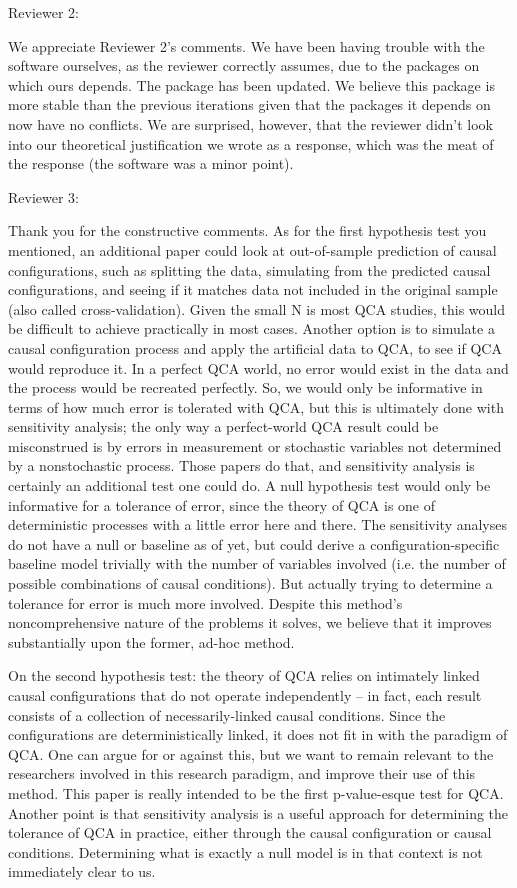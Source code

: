 \documentclass[12pt,stdletter,dateno,sigleft]{newlfm} %
\begin{document}
\begin{newlfm}
Reviewer 2: 

We appreciate Reviewer 2's comments. We have been having trouble with the software ourselves, as the reviewer correctly assumes, due to the packages on which ours depends. The package has been updated. We believe this package is more stable than the previous iterations given that the packages it depends on now have no conflicts. We are surprised, however, that the reviewer didn't look into our theoretical justification we wrote as a response, which was the meat of the response (the software was a minor point). \newline


Reviewer 3: 

Thank you for the constructive comments. As for the first hypothesis test you mentioned, an additional paper could look at out-of-sample prediction of causal configurations, such as splitting the data, simulating from the predicted causal configurations, and seeing if it matches data not included in the original sample (also called cross-validation). Given the small N is most QCA studies, this would be difficult to achieve practically in most cases. Another option is to simulate a causal configuration process and apply the artificial data to QCA, to see if QCA would reproduce it. In a perfect QCA world, no error would exist in the data and the process would be recreated perfectly. So, we would only be informative in terms of how much error is tolerated with QCA, but this is ultimately done with sensitivity analysis; the only way a perfect-world QCA result could be misconstrued is by errors in measurement or stochastic variables not determined by a nonstochastic process. Those papers do that, and sensitivity analysis is certainly an additional test one could do. A null hypothesis test would only be informative for a tolerance of error, since the theory of QCA is one of deterministic processes with a little error here and there. The sensitivity analyses do not have a null or baseline as of yet, but could derive a configuration-specific baseline model trivially with the number of variables involved (i.e. the number of possible combinations of causal conditions). But actually trying to determine a tolerance for error is much more involved. Despite this method's noncomprehensive nature of the problems it solves, we believe that it improves substantially upon the former, ad-hoc method.

On the second hypothesis test: the theory of QCA relies on intimately linked causal configurations that do not operate independently -- in fact, each result consists of a collection of necessarily-linked causal conditions. Since the configurations are deterministically linked, it does not fit in with the paradigm of QCA. One can argue for or against this, but we want to remain relevant to the researchers involved in this research paradigm, and improve their use of this method. This paper is really intended to be the first p-value-esque test for QCA. Another point is that sensitivity analysis is a useful approach for determining the tolerance of QCA in practice, either through the causal configuration or causal conditions. Determining what is exactly a null model is in that context is not immediately clear to us. 


\end{newlfm}
\end{document}
